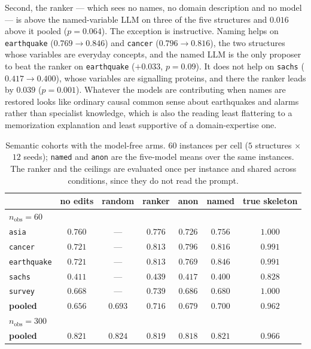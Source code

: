 \documentclass{article}
\begin{document}
Second, the ranker --- which sees no names, no domain description and no model --- is above the
named-variable LLM on three of the five structures and $0.016$ above it pooled ($p=0.064$). The
exception is instructive. Naming helps on \texttt{earthquake} ($0.769 \to 0.846$) and
\texttt{cancer} ($0.796 \to 0.816$), the two structures whose variables are everyday concepts, and
the named LLM is the only proposer to beat the ranker on \texttt{earthquake} ($+0.033$, $p=0.09$).
It does not help on \texttt{sachs} ($0.417 \to 0.400$), whose variables are signalling proteins, and
there the ranker leads by $0.039$ ($p=0.001$). Whatever the models are contributing when names are
restored looks like ordinary causal common sense about earthquakes and alarms rather than
specialist knowledge, which is also the reading least flattering to a memorization explanation and
least supportive of a domain-expertise one.

\begin{table}[h]
\caption{Semantic cohorts with the model-free arms. $60$ instances per cell ($5$ structures $\times$
$12$ seeds); \texttt{named} and \texttt{anon} are the five-model means over the same instances. The
ranker and the ceilings are evaluated once per instance and shared across conditions, since they do
not read the prompt.}
\label{tab:semantic_rank}
\centering
\small
\setlength{\tabcolsep}{5pt}
\begin{tabular}{lcccccc}
\toprule
& no edits & random & ranker & anon & named & true skeleton \\
\midrule
\multicolumn{7}{l}{\emph{$n_{\mathrm{obs}}=60$}}\\
\texttt{asia}       & $0.760$ & --- & $0.776$ & $0.726$ & $0.756$ & $1.000$ \\
\texttt{cancer}     & $0.721$ & --- & $0.813$ & $0.796$ & $0.816$ & $0.991$ \\
\texttt{earthquake} & $0.721$ & --- & $0.813$ & $0.769$ & $0.846$ & $0.991$ \\
\texttt{sachs}      & $0.411$ & --- & $0.439$ & $0.417$ & $0.400$ & $0.828$ \\
\texttt{survey}     & $0.668$ & --- & $0.739$ & $0.686$ & $0.680$ & $1.000$ \\
\textbf{pooled}     & $0.656$ & $0.693$ & $\mathbf{0.716}$ & $0.679$ & $0.700$ & $0.962$ \\
\midrule
\multicolumn{7}{l}{\emph{$n_{\mathrm{obs}}=300$}}\\
\textbf{pooled}     & $0.821$ & $0.824$ & $0.819$ & $0.818$ & $0.821$ & $0.966$ \\
\bottomrule
\end{tabular}
\end{table}
\end{document}
